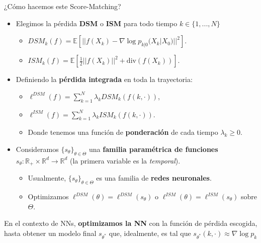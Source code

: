 \documentclass[aspectratio=169,xcolor=dvipsnames, t, spanish]{beamer}
\begin{document}
    \begin{frame}{¿Cómo hacemos este Score-Matching?}
        \begin{itemize}
            \item Elegimos la pérdida \textbf{DSM} o \textbf{ISM} para todo tiempo $k\in\{1,...,N\}$
            \begin{itemize}
                \item $DSM_{k}(f)=\mathbb{E}[||f(X_{k})-\nabla \log p_{k|0}(X_{k}|X_{0})||^{2}]$.
                \item $ISM_{k}(f)=\mathbb{E}[\frac{1}{2}||f(X_{k})||^{2}+\text{div}(f(X_{k}))]$.
            \end{itemize}
            \pause\item Definiendo la \textbf{pérdida integrada} en toda la trayectoria:
            \begin{itemize}
                \item $\ell^{DSM}(f)=\sum_{k=1}^{N}\lambda_{k}DSM_{k}(f(k,\cdot))$,
                \item $\ell^{ISM}(f)=\sum_{k=1}^{N}\lambda_{k}ISM_{k}(f(k,\cdot))$.
                \item Donde tenemos una función de \textbf{ponderación} de cada tiempo $\lambda_{k}\ge0$.
            \end{itemize}
            \pause\item Consideramos $\{s_{\theta}\}_{\theta\in\Theta}$ una \textbf{familia paramétrica de funciones} $s_{\theta}:\mathbb{R}_{+}\times\mathbb{R}^{d}\rightarrow\mathbb{R}^{d}$ (la primera variable es la \textit{temporal}).
            \begin{itemize}
                \item Usualmente, $\{s_{\theta}\}_{\theta\in\Theta}$ es una familia de \textbf{redes neuronales}.
                \item Optimizamos $\ell^{DSM}(\theta)=\ell^{DSM}(s_{\theta})$ o $\ell^{ISM}(\theta)=\ell^{ISM}(s_{\theta})$ sobre $\Theta$.
            \end{itemize}
        \end{itemize}
        \pause
        \begin{center}
            En el contexto de NNs, \textbf{optimizamos la NN} con la función de pérdida escogida, hasta obtener un modelo final $s_{\theta^{*}}$ que, idealmente, es tal que $s_{\theta^{*}}(k,\cdot)\approx\nabla \log p_{k}$
        \end{center}
    \end{frame}
    
\end{document}
